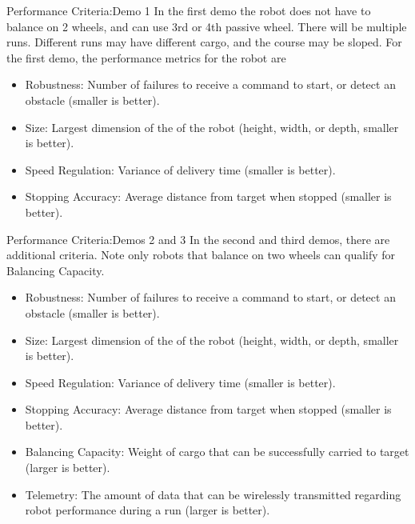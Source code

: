 \begin{frame}{Performance Criteria:}{Demo 1}
In the first demo the robot does not have to balance on 2 wheels, and can use 3rd or 4th passive wheel. There will be multiple runs. Different runs may have different cargo, and the course may be sloped. For the first demo, the performance metrics for the robot are 
\begin{itemize}
\item Robustness: Number of failures to receive a command to start, or detect an obstacle (smaller is better).
\item Size: Largest dimension of the of the robot (height, width, or depth, smaller is better).
\item Speed Regulation: Variance of delivery time (smaller is better).
\item Stopping Accuracy: Average distance from target when stopped (smaller is better).
\end{itemize}
\end{frame}

\begin{frame}{Performance Criteria:}{Demos 2 and 3}
In the second and third demos, there are additional criteria. Note only robots that balance on two wheels can qualify for Balancing Capacity. 
\begin{itemize}
\item Robustness: Number of failures to receive a command to start, or detect an obstacle (smaller is better).
\item Size: Largest dimension of the of the robot (height, width, or depth, smaller is better).
\item Speed Regulation: Variance of delivery time (smaller is better).
\item Stopping Accuracy: Average distance from target when stopped (smaller is better).
\item Balancing Capacity: Weight of cargo that can be successfully carried to target (larger is better).
\item Telemetry: The amount of data that can be wirelessly transmitted regarding robot performance during a run (larger is better).
\end{itemize}
\end{frame}


